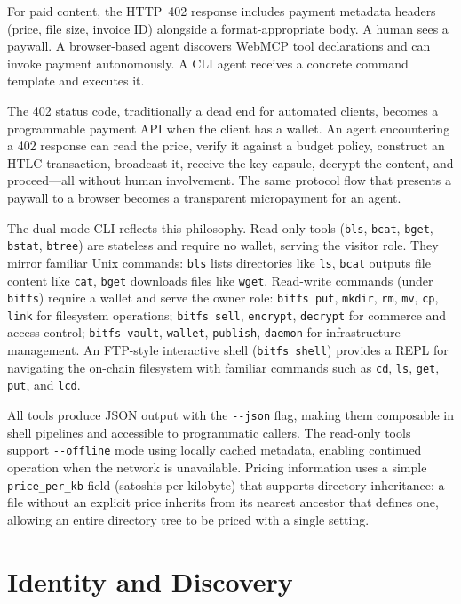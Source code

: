 \documentclass[11pt,a4paper]{article}
\begin{document}
For paid content, the HTTP~402 response includes payment metadata headers (price, file size, invoice ID) alongside a format-appropriate body. A human sees a paywall. A browser-based agent discovers WebMCP tool declarations and can invoke payment autonomously. A CLI agent receives a concrete command template and executes it.

The 402 status code, traditionally a dead end for automated clients, becomes a programmable payment API when the client has a wallet. An agent encountering a 402 response can read the price, verify it against a budget policy, construct an HTLC transaction, broadcast it, receive the key capsule, decrypt the content, and proceed---all without human involvement. The same protocol flow that presents a paywall to a browser becomes a transparent micropayment for an agent.

The dual-mode CLI reflects this philosophy. Read-only tools (\texttt{bls}, \texttt{bcat}, \texttt{bget}, \texttt{bstat}, \texttt{btree}) are stateless and require no wallet, serving the visitor role. They mirror familiar Unix commands: \texttt{bls} lists directories like \texttt{ls}, \texttt{bcat} outputs file content like \texttt{cat}, \texttt{bget} downloads files like \texttt{wget}. Read-write commands (under \texttt{bitfs}) require a wallet and serve the owner role: \texttt{bitfs put}, \texttt{mkdir}, \texttt{rm}, \texttt{mv}, \texttt{cp}, \texttt{link} for filesystem operations; \texttt{bitfs sell}, \texttt{encrypt}, \texttt{decrypt} for commerce and access control; \texttt{bitfs vault}, \texttt{wallet}, \texttt{publish}, \texttt{daemon} for infrastructure management. An FTP-style interactive shell (\texttt{bitfs shell}) provides a REPL for navigating the on-chain filesystem with familiar commands such as \texttt{cd}, \texttt{ls}, \texttt{get}, \texttt{put}, and \texttt{lcd}.

All tools produce JSON output with the \texttt{-{}-json} flag, making them composable in shell pipelines and accessible to programmatic callers. The read-only tools support \texttt{-{}-offline} mode using locally cached metadata, enabling continued operation when the network is unavailable. Pricing information uses a simple \texttt{price\_per\_kb} field (satoshis per kilobyte) that supports directory inheritance: a file without an explicit price inherits from its nearest ancestor that defines one, allowing an entire directory tree to be priced with a single setting.

\section{Identity and Discovery}
\end{document}
